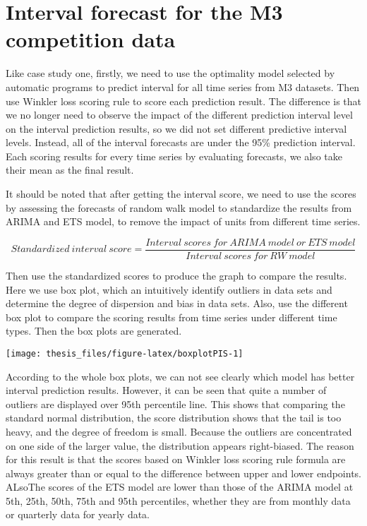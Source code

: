 \documentclass{monashthesis}
\theoremstyle{definition}
\theoremstyle{definition}
\theoremstyle{definition}
\theoremstyle{remark}
\begin{document}
\section{Interval forecast for the M3 competition
data}\label{interval-forecast-for-the-m3-competition-data}

Like case study one, firstly, we need to use the optimality model
selected by automatic programs to predict interval for all time series
from M3 datasets. Then use Winkler loss scoring rule to score each
prediction result. The difference is that we no longer need to observe
the impact of the different prediction interval level on the interval
prediction results, so we did not set different predictive interval
levels. Instead, all of the interval forecasts are under the 95\%
prediction interval. Each scoring results for every time series by
evaluating forecasts, we also take their mean as the final result.

It should be noted that after getting the interval score, we need to use
the scores by assessing the forecasts of random walk model to
standardize the results from ARIMA and ETS model, to remove the impact
of units from different time series.

\[Standardized~interval~score=\frac{Interval~scores~for~ARIMA~model~or~ETS~model}{Interval~scores~for~RW~model}\]

Then use the standardized scores to produce the graph to compare the
results. Here we use box plot, which an intuitively identify outliers in
data sets and determine the degree of dispersion and bias in data sets.
Also, use the different box plot to compare the scoring results from
time series under different time types. Then the box plots are
generated.

\texttt{[image: thesis\_files/figure-latex/boxplotPIS-1]}

According to the whole box plots, we can not see clearly which model has
better interval prediction results. However, it can be seen that quite a
number of outliers are displayed over 95th percentile line. This shows
that comparing the standard normal distribution, the score distribution
shows that the tail is too heavy, and the degree of freedom is small.
Because the outliers are concentrated on one side of the larger value,
the distribution appears right-biased. The reason for this result is
that the scores based on Winkler loss scoring rule formula are always
greater than or equal to the difference between upper and lower
endpoints. ALsoThe scores of the ETS model are lower than those of the
ARIMA model at 5th, 25th, 50th, 75th and 95th percentiles, whether they
are from monthly data or quarterly data for yearly data.
\end{document}

